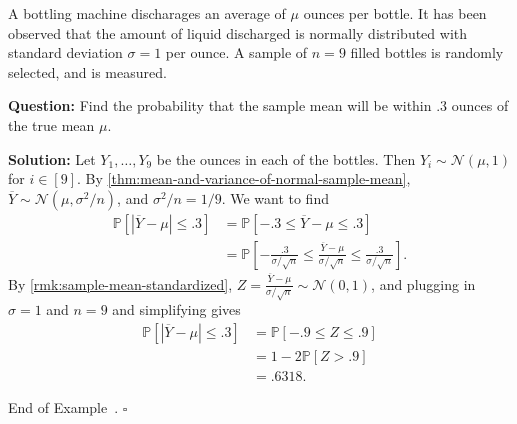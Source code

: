 \documentclass[10pt]{article}
\theoremstyle{definition}
\newtheorem{example}[theorem]{Example}
\renewenvironment{example}
{\begin{oldexample}}
  {\par\smallskip\hfill   End of Example~\theexample. $\square$    \par\end{oldexample}}
\newcommand{\vt}{\vskip 5mm} %
\newcommand{\Fl}{\vt\noindent\textbf} %
\newcommand{\1}[1]{\textbf{1}_{\left[#1\right]}} %
\def\P{\mathbb{P}} %
\begin{document}
\begin{example}[Example 7.2 in textbook]
  \label{ex:example-7.2-textbook-bottling}
  A bottling machine discharages an average of $\mu$ ounces per bottle. It has
  been observed that the amount of liquid discharged is normally distributed
  with standard deviation $\sigma=1$ per ounce. A sample of $n=9$ filled
  bottles is randomly selected, and is measured.

  \Fl{Question:} Find the probability that the sample mean will be within
  $.3$ ounces of the true mean $\mu$.


  \Fl{Solution:} Let $Y_{1},\ldots,Y_{9}$ be the ounces in each of the
  bottles. Then $Y_{i}\sim \mathcal{N}(\mu,1)$ for $i\in [9]$. By
  \cref{thm:mean-and-variance-of-normal-sample-mean}, $\overline{Y}\sim \mathcal{N}(\mu,
  \sigma^{2}/n)$, and $\sigma^{2}/n=1/9$. We want to find
  \begin{align}\label{eq:4}
    \P\left[\left| \overline{Y}-\mu \right| \leq .3\right] 
    &= \P\left[-.3 \leq \overline{Y}-\mu \leq .3\right] \nonumber\\
    &= \P\left[- \frac{.3}{\sigma/\sqrt{n}}\leq \frac{\overline{Y}-\mu}{\sigma/\sqrt{n}} \leq \frac{.3}{\sigma/\sqrt{n}}\right].
  \end{align}
  By \cref{rmk:sample-mean-standardized},
  $Z=\frac{\overline{Y}-\mu}{\sigma/\sqrt{n}}\sim \mathcal{N}(0,1)$, and
  plugging in $\sigma=1$ and $n=9$ and simplifying gives
  \begin{align*}
    \P\left[\left| \overline{Y}-\mu \right| \leq .3\right] 
    &= \P\left[-.9 \leq Z \leq .9\right]\\
    &= 1- 2 \P\left[Z>.9 \right]\\
    &=.6318.
  \end{align*}
\end{example}
\end{document}
